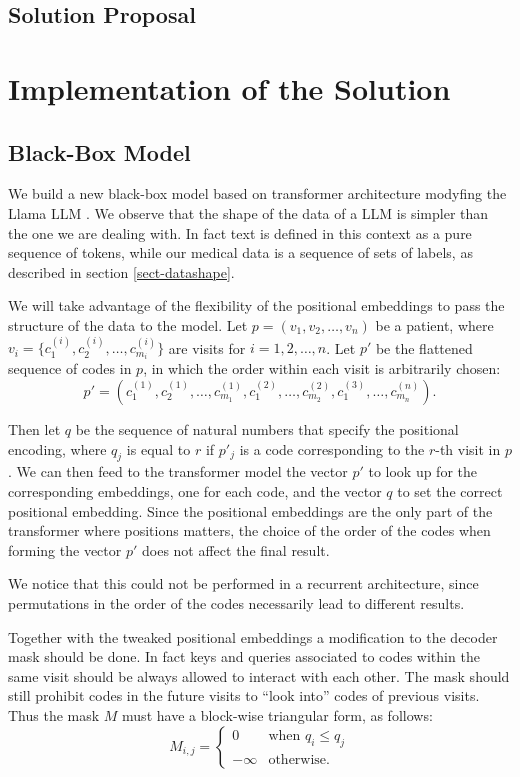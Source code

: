 \documentclass[]{marticle}
\begin{document}
\subsection{Solution Proposal}

\section{Implementation of the Solution}

\subsection{Black-Box Model} \label{sect-kelso}

We build a new black-box model based on transformer architecture modyfing the Llama LLM . We observe that the shape of the data of a LLM is simpler than the one we
are dealing with. In fact text is defined in this context as a pure sequence of tokens, while our
medical data is a sequence of sets of labels, as described in section \ref{sect-datashape}.

We will take advantage of the flexibility of the positional embeddings to pass the structure of the
data to the model. Let $p=(v_1, v_2, \dots, v_n)$ be a patient, where $v_i=\{c^{(i)}_1, c^{(i)}_2,
\dots, c^{(i)}_{m_i}\}$ are visits for $i=1,2,\dots, n$. Let $p'$ be the flattened sequence of codes
in $p$, in which the order within each visit is arbitrarily chosen:
\begin{equation*}
    p' = (c^{(1)}_1, c^{(1)}_2, \dots, c^{(1)}_{m_1}, c^{(2)}_1, \dots, c^{(2)}_{m_2}, c^{(3)}_1,
    \dots, c^{(n)}_{m_n}).
\end{equation*}

Then let $q$ be the sequence of natural numbers that specify the positional encoding, where $q_j$ is
equal to $r$ if $p'_j$ is a code corresponding to the $r$-th visit in $p$. We can then feed to the
transformer model the vector $p'$ to look up for the corresponding embeddings, one for each code,
and the vector $q$ to set the correct positional embedding. Since the positional embeddings are the
only part of the transformer where positions matters, the choice of the order of the codes when
forming the vector $p'$ does not affect the final result.

We notice that this could not be performed in a recurrent architecture, since permutations in the
order of the codes necessarily lead to different results.

Together with the tweaked positional embeddings a modification to the decoder mask should be done.
In fact keys and queries associated to codes within the same visit should be always allowed to
interact with each other. The mask should still prohibit codes in the future visits to ``look
into'' codes of previous visits. Thus the mask $M$ must have a block-wise triangular form, as
follows:
\begin{equation*}
    M_{i,j} = \begin{cases}
        0       & \text{when $q_i\leq q_j$} \\
        -\infty & \text{otherwise.}
    \end{cases}
\end{equation*}
\end{document}
